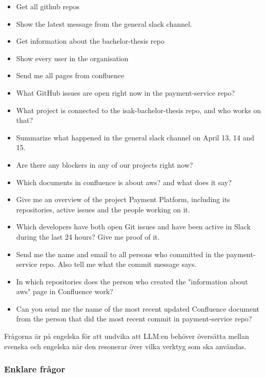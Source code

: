 \begin{itemize}
\item[Q1] Get all github repos
\item[Q2] Show the latest message from the general slack channel.
\item[Q3] Get information about the bachelor-thesis repo
\item[Q4] Show every user in the organisation
\item[Q5] Send me all pages from confluence
\item[Q6] What GitHub issues are open right now in the payment-service repo?
\item[Q7] What project is connected to the isak-bachelor-thesis repo, and who works on that? 
\item[Q8] Summarize what happened in the general slack channel on April 13, 14 and 15.    
\item[Q9] Are there any blockers in any of our projects right now?
\item[Q10] Which documents in confluence is about aws? and what does it say?
\item[Q11] Give me an overview of the project Payment Platform, including its repositories, active issues and the people working on it.
\item[Q12] Which developers have both open Git issues and have been active in Slack during the last 24 hours? Give me proof of it.
\item[Q13] Send me the name and email to all persons who committed in the payment-service repo. Also tell me what the commit message says.
\item[Q14] In which repositories does the person who created the "information about aws" page in Confluence work?     
\item[Q15] Can you send me the name of the most recent updated Confluence document from the person that did the most recent commit in payment-service repo?
\end{itemize}

Frågorna är på engelska för att undvika att LLM:en behöver översätta mellan svenska och engelska när den resonerar över vilka verktyg som ska användas.

\subsubsection{Enklare frågor}\label{subsubsec:enklareFragorResult}

